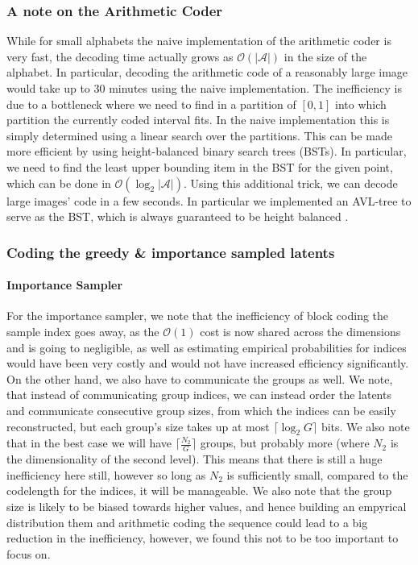 \documentclass{article}
\newcommand{\A}{\mathcal{A}}
\newcommand{\Oh}{\mathcal{O}}
\begin{document}
\subsubsection{A note on the Arithmetic Coder}
\par
While for small alphabets the naive implementation of the arithmetic coder is
very fast, the decoding time actually grows as $\Oh(|\A|)$ in the size of the
alphabet. In particular, decoding the arithmetic code of a reasonably large
image would take up to 30 minutes using the naive implementation. The
inefficiency is due to a bottleneck where we need to find in a partition of $[0,
1]$ into which partition the currently coded interval fits. In the naive
implementation this is simply determined using a linear search over the
partitions. This can be made more efficient by using height-balanced binary
search trees (BSTs). In particular, we need to find the least upper bounding
item in the BST for the given point, which can be done in $\Oh(\log_2|\A|)$.
Using this additional trick, we can decode large images' code in a few seconds.
In particular we implemented an AVL-tree to serve as the BST, which is always
guaranteed to be height balanced \cite{adel1962algorithm}.
\subsubsection{Coding the greedy \& importance sampled latents}
\par
\paragraph{Importance Sampler}  For the importance sampler, we note that the
inefficiency of block coding the sample index goes away, as the $\Oh(1)$ cost is
now shared across the dimensions and is going to negligible, as well as
estimating empirical probabilities for indices would have been very costly and
would not have increased efficiency significantly. On the other hand, we also
have to communicate the groups as well. We note, that instead of communicating
group indices, we can instead order the latents and communicate consecutive
group sizes, from which the indices can be easily reconstructed, but each
group's size takes up at most $\lceil \log_2G \rceil$ bits. We also note that in
the best case we will have $\lceil \frac{N_2}{G} \rceil$ groups, but probably
more (where $N_2$ is the dimensionality of the second level). This means that
there is still a huge inefficiency here still, however so long as $N_2$ is
sufficiently small, compared to the codelength for the indices, it will be
manageable. We also note that the group size is likely to be biased towards
higher values, and hence building an empyrical distribution them and arithmetic
coding the sequence could lead to a big reduction in the inefficiency, however,
we found this not to be too important to focus on. 
\end{document}
